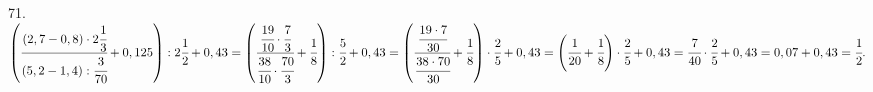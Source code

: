 71. $\left(\cfrac{(2,7-0,8)\cdot2\cfrac{1}{3}}{(5,2-1,4):\cfrac{3}{70}}+0,125\right):2\cfrac{1}{2}+0,43=
\left(\cfrac{\cfrac{19}{10}\cdot\cfrac{7}{3}}{\cfrac{38}{10}\cdot\cfrac{70}{3}}+\cfrac{1}{8}\right):\cfrac{5}{2}+0,43=
\left(\cfrac{\cfrac{19\cdot7}{30}}{\cfrac{38\cdot70}{30}}+\cfrac{1}{8}\right)\cdot\cfrac{2}{5}+0,43=
\left(\cfrac{1}{20}+\cfrac{1}{8}\right)\cdot\cfrac{2}{5}+0,43=\cfrac{7}{40}\cdot\cfrac{2}{5}+0,43=0,07+0,43=\cfrac{1}{2}.$\\
